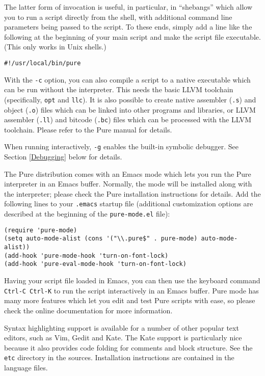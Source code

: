 \documentclass[a4paper,12pt]{article}
\begin{document}
The latter form of invocation is useful, in particular, in ``shebangs'' which allow you to run a script directly from the shell, with additional command line parameters being passed to the script. To these ends, simply add a line like the following at the beginning of your main script and make the script file executable. (This only works in Unix shells.)

\begin{lstlisting}
#!/usr/local/bin/pure
\end{lstlisting}

With the \verb|-c| option, you can also compile a script to a native executable which can be run without the interpreter. This needs the basic LLVM toolchain (specifically, \texttt{opt} and \texttt{llc}). It is also possible to create native assembler (\texttt{.s}) and object (\texttt{.o}) files which can be linked into other programs and libraries, or LLVM assembler (\texttt{.ll}) and bitcode (\texttt{.bc}) files which can be processed with the LLVM toolchain. Please refer to the Pure manual for details.

When running interactively, \verb|-g| enables the built-in symbolic debugger. See Section \ref{Debugging} below for details.

The Pure distribution comes with an Emacs mode which lets you run the Pure interpreter in an Emacs buffer. Normally, the mode will be installed along with the interpreter; please check the Pure installation instructions for details. Add the following lines to your \texttt{.emacs} startup file (additional customization options are described at the beginning of the \texttt{pure-mode.el} file):

\begin{verbatim}
(require 'pure-mode)
(setq auto-mode-alist (cons '("\\.pure$" . pure-mode) auto-mode-alist))
(add-hook 'pure-mode-hook 'turn-on-font-lock)
(add-hook 'pure-eval-mode-hook 'turn-on-font-lock)
\end{verbatim}

Having your script file loaded in Emacs, you can then use the keyboard command \texttt{Ctrl-C Ctrl-K} to run the script interactively in an Emacs buffer. Pure mode has many more features which let you edit and test Pure scripts with ease, so please check the online documentation for more information.

Syntax highlighting support is available for a number of other popular text editors, such as Vim, Gedit and Kate. The Kate support is particularly nice because it also provides code folding for comments and block structure. See the \texttt{etc} directory in the sources. Installation instructions are contained in the language files.
\end{document}
